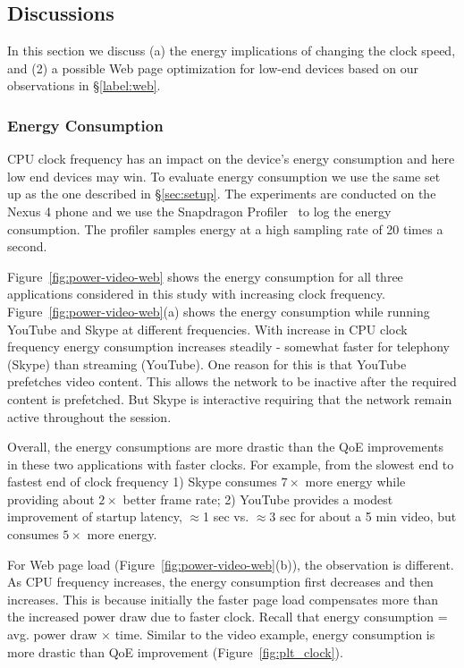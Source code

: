 \subsection{Discussions}
\label{sec:energy}

In this section we discuss (a) the energy implications of changing the clock speed, and (2) a possible Web page optimization for low-end devices based on our observations in \S\ref{label:web}.

\subsubsection{Energy Consumption}
CPU clock frequency has an impact on the device's energy consumption and here low end devices may win. To evaluate 
energy consumption we use the same set up as the one described in \S\ref{sec:setup}. The experiments are conducted on the Nexus 4 phone and we use the Snapdragon Profiler~\cite{qualsnap} to log the energy consumption. The profiler samples energy at a high sampling rate of 20 times a second. %

Figure~\ref{fig:power-video-web}
shows the energy consumption for all three applications
considered in this study with increasing 
clock frequency. Figure~\ref{fig:power-video-web}(a) shows the energy consumption while running YouTube and Skype at different frequencies. With increase in CPU clock frequency energy consumption increases steadily - somewhat faster for telephony (Skype) than streaming (YouTube). One reason for this is that YouTube prefetches video content. This allows the network to be inactive after the required content is prefetched. But Skype is interactive requiring that the network remain active throughout the session. 

Overall, the energy consumptions are more
drastic than the QoE improvements in these two applications
with faster clocks. For example, from the slowest end to fastest
end of clock frequency 1) Skype consumes $7\times$ more 
energy  while providing about $2\times$ better
frame rate; 2)  YouTube provides a modest
improvement of startup latency, $\approx$1 sec vs. 
$\approx$3 sec for about a 5 min video, but consumes
$5\times$ more energy. 

For Web page load (Figure~\ref{fig:power-video-web}(b)), 
the observation is different. As CPU frequency increases, the 
energy consumption first decreases and then increases. This 
is because initially the faster page load compensates
more than the increased power draw due to faster 
clock. Recall that 
energy consumption = avg. power draw $\times$ time. Similar to the video example, energy consumption is more drastic than QoE improvement (Figure~\ref{fig:plt_clock}). %

